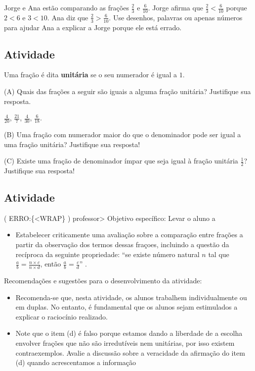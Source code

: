 \documentclass[a4,12pt]{book}
\begin{document}
Jorge e Ana estão comparando as frações $\frac{2}{3}$ e $\frac{6}{10}$. Jorge afirma que 
$\frac{2}{3} < \frac{6}{10}$ porque $2 < 6$ e $3 < 10$. Ana diz que $\frac{2}{3} > \frac{6}{10}$. Use desenhos, palavras ou apenas números para ajudar Ana a explicar a Jorge porque ele está errado.








\subsection{Atividade}







Uma fração é dita {\bf unitária} se o seu numerador é igual a $1$. 

(A) Quais das frações a seguir são iguais a alguma fração unitária? Justifique sua resposta.

$\frac{4}{20}$, $\frac{21}{7}$, $\frac{4}{30}$, $\frac{6}{18}$.

(B) Uma fração com numerador maior do que o denominador pode ser igual a uma fração unitária? Justifique sua resposta!

(C) Existe uma fração de denominador ímpar que seja igual à fração unitária $\frac{1}{2}$? Justifique sua resposta! 








\subsection{Atividade}




( ERRO:\{<WRAP\} ) professor>
Objetivo específico: Levar o aluno a
\begin{itemize} %
  \item     Estabelecer criticamente uma avaliação sobre a comparação entre frações a partir da observação dos termos dessas fraçoes, incluindo a questão da recíproca da seguinte propriedade:     ``se existe número natural $n$ tal que $\frac{a}{b} = \frac{n \times c}{n \times d}$, então $\frac{a}{b} = \frac{c}{d}$''    . 
\end{itemize} %


Recomendações e sugestões para o desenvolvimento da atividade:
\begin{itemize} %
  \item     Recomenda-se que, nesta atividade, os alunos trabalhem individualmente ou em duplas. No entanto, é fundamental que os alunos sejam estimulados a explicar o raciocínio realizado.
  \item     Note que o item (d) é falso porque estamos dando a liberdade de a escolha envolver frações que não são irredutíveis nem unitárias, por isso existem contraexemplos. Avalie a discussão sobre a veracidade da afirmação do item (d) quando acrescentamos a informação 
\end{itemize} %
\end{document}
